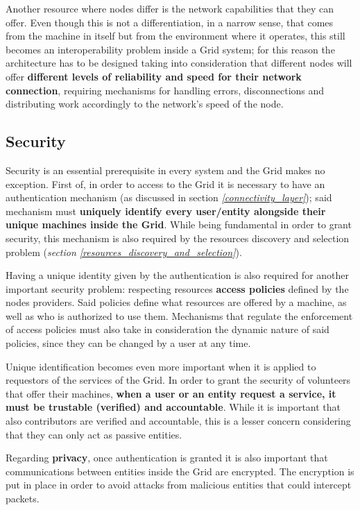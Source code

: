Another resource where nodes differ is the network capabilities that they can offer. Even though this is not a differentiation, in a narrow sense, that comes from the machine in itself but from the environment where it operates, this still becomes an interoperability problem inside a Grid system; for this reason the architecture has to be designed taking into consideration that different nodes will offer \textbf{different levels of reliability and speed for their network connection}, requiring mechanisms for handling errors, disconnections and distributing work accordingly to the network's speed of the node. 

\subsection{Security}\label{security}
Security is an essential prerequisite in every system and the Grid makes no exception. First of, in order to access to the Grid it is necessary to have an authentication mechanism (as discussed in section \textit{\ref{connectivity_layer}}); said mechanism must \textbf{uniquely identify every user/entity alongside their unique machines inside the Grid}. While being fundamental in order to grant security, this mechanism is also required by the resources discovery and selection problem (\textit{section \ref{resources_discovery_and_selection}}).

Having a unique identity given by the authentication is also required for another important security problem: respecting resources \textbf{access policies} defined by the nodes providers. Said policies define what resources are offered by a machine, as well as who is authorized to use them. Mechanisms that regulate the enforcement of access policies must also take in consideration the dynamic nature of said policies, since they can be changed by a user at any time.

Unique identification becomes even more important when it is applied to requestors of the services of the Grid. In order to grant the security of volunteers that offer their machines, \textbf{when a user or an entity request a service, it must be trustable (verified) and accountable}. While it is important that also contributors are verified and accountable, this is a lesser concern considering that they can only act as passive entities.

Regarding \textbf{privacy}, once authentication is granted it is also important that communications between entities inside the Grid are encrypted. The encryption is put in place in order to avoid attacks from malicious entities that could intercept packets.

